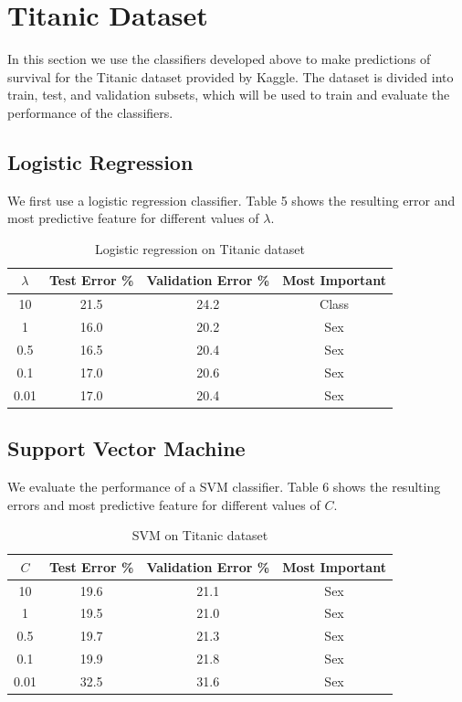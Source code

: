 \documentclass[10pt,twocolumn]{article}
\begin{document}
\section{Titanic Dataset}

In this section we use the classifiers developed above to make predictions of survival for the Titanic dataset provided by Kaggle. The dataset is divided into train, test, and validation subsets, which will be used to train and evaluate the performance of the classifiers.

\subsection*{Logistic Regression}

We first use a logistic regression classifier. Table 5 shows the resulting error and most predictive feature for different values of $\lambda$.

\begin{table}
 \caption{Logistic regression on Titanic dataset}
  \begin{tabular}{ | c | c | c | c |}
 \hline
 $\lambda$ & Test Error \% & Validation Error \% & Most Important  \\ \hline 
 10 & 21.5 & 24.2 & Class  \\ \hline
 1 & 16.0 & 20.2 & Sex  \\ \hline
 0.5 & 16.5 & 20.4 & Sex \\ \hline
 0.1 & 17.0 & 20.6 & Sex \\ \hline 
 0.01 & 17.0 & 20.4 & Sex \\ \hline
 \end{tabular}
 \label{SVM C1 T}
\end{table}
      
\subsection*{Support Vector Machine}

We evaluate the performance of a SVM classifier. Table 6 shows the resulting errors and most predictive feature for different values of $C$.

\begin{table}
 \caption{SVM on Titanic dataset}
  \begin{tabular}{ | c | c | c | c |}
 \hline
 $C$ & Test Error \% & Validation Error \% & Most Important  \\ \hline 
 10 &  19.6 & 21.1 &  Sex \\ \hline
 1 & 19.5 & 21.0 & Sex  \\ \hline
 0.5 & 19.7 & 21.3 & Sex \\ \hline
 0.1 & 19.9 & 21.8 & Sex  \\ \hline 
 0.01 & 32.5 & 31.6 & Sex \\ \hline
 \end{tabular}
 \label{SVM C1 T}
\end{table}
\end{document}
